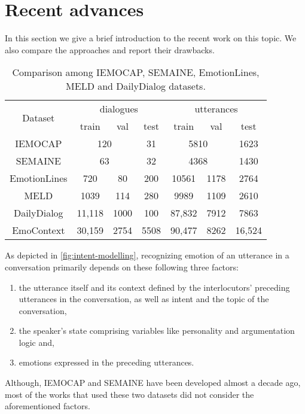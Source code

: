 \documentclass{IEEEtran}\usepackage[pdftex]{graphicx}
\begin{document}
	\section{Recent advances}
	\label{sec:benchmarks}
	In this section we give a brief introduction to the recent work on this topic. We also compare the approaches and report their drawbacks.
	\begin{table*}[h!]
		\centering
		\begin{tabular}{c|c|c|c|c|c|c}
			\toprule
			\multirow{2}{*}{Dataset}&\multicolumn{3}{c|}{ dialogues}&\multicolumn{3}{c}{ utterances}\\
			&train&val&test&train&val&test\\
			\hline \hline
			IEMOCAP&\multicolumn{2}{c|}{120}&31&\multicolumn{2}{c|}{5810}&1623\\
			SEMAINE&\multicolumn{2}{c|}{63}&32&\multicolumn{2}{c|}{4368}&1430\\
			EmotionLines&720&80&200&10561&1178&2764\\
			MELD&1039&114&280& 9989& 1109& 2610\\
			DailyDialog&11,118&1000&100&87,832&7912&7863\\
			EmoContext&30,159&2754&5508&90,477&8262&16,524\\
			\bottomrule
		\end{tabular}
		\caption{Comparison among IEMOCAP, SEMAINE, EmotionLines, MELD and DailyDialog datasets.}
		\label{table:data}
	\end{table*}
	
	As depicted in \cref{fig:intent-modelling}, recognizing emotion of an utterance in a conversation primarily depends on these following three factors: 
	\begin{enumerate}
		\item the utterance itself and its context defined by the interlocutors' preceding utterances in the conversation, as well as intent and the topic of the conversation,
		\item the speaker's state comprising variables like personality and argumentation logic and,
		\item emotions expressed in the preceding utterances.
	\end{enumerate}
	Although, IEMOCAP and SEMAINE have been developed almost a decade ago, most of the works that used these two datasets did not consider the aforementioned factors.
\end{document}
